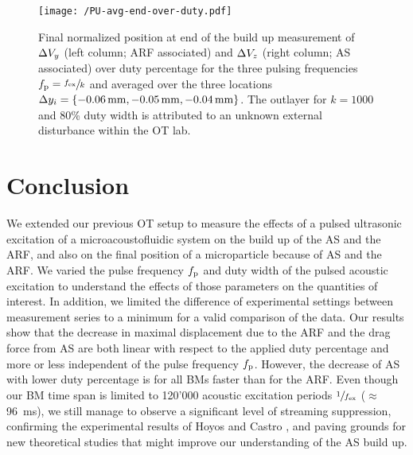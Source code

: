 \begin{figure*}[tbp]
  \centering
  \texttt{[image: /PU-avg-end-over-duty.pdf]}
  \caption{Final normalized position at end of the build up measurement of 
  $\Delta V_{y}$ (left column; ARF associated) and $\Delta V_{z}$ (right column; AS 
  associated) over duty percentage for the three pulsing frequencies 
  $f_{\mathrm{p}}=\sfrac{f_{\mathrm{ex}}}{k}$ and averaged over the three locations $\Dy_{i} =
\{\SI{-0.06}{\mm},\SI{-0.05}{\mm},\SI{-0.04}{\mm}\}$. The outlayer for $k=1000$ 
and 80\% duty width is attributed to an unknown external disturbance within the 
OT lab.}\label{fig:PU-all-duty}
\end{figure*}

\section{Conclusion}
We extended our previous OT setup to measure the effects of a pulsed ultrasonic 
excitation of a microacoustofluidic system on the build up of the AS and the 
ARF, and also on the final position of a microparticle because of AS and the 
ARF. We varied the pulse frequency $f_{\mathrm{p}}$ and duty width of the pulsed acoustic 
excitation to understand the effects of those parameters on the quantities of 
interest. In addition, we limited the difference of experimental settings 
between measurement series to a minimum for a valid comparison of the data. Our 
results show that the decrease in maximal displacement due to the ARF and the 
drag force from AS are both linear with respect to the applied duty percentage 
and more or less independent of the pulse frequency $f_{\mathrm{p}}$. However, the 
decrease of AS with lower duty percentage is for all BMs faster than for the 
ARF. Even though our BM time span is limited to 120'000 acoustic excitation 
periods $\sfrac{1}{f_{\mathrm{ex}}}$ ($\approx$ \SI{96}{\ms}), we still manage to observe 
a significant level of streaming suppression, confirming the experimental 
results of Hoyos and Castro \cite{Castro2016,Hoyos2013}, and paving grounds for 
new theoretical studies that might improve our understanding of the AS build 
up.

